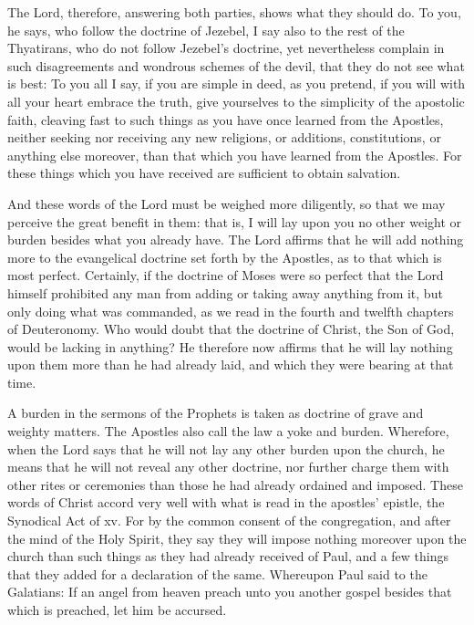 The Lord, therefore, answering both parties, shows what they should do. To you, he says, who follow the doctrine of Jezebel, I say also to the rest of the Thyatirans, who do not follow Jezebel’s doctrine, yet nevertheless complain in such disagreements and wondrous schemes of the devil, that they do not see what is best: To you all I say, if you are simple in deed, as you pretend, if you will with all your heart embrace the truth, give yourselves to the simplicity of the apostolic faith, cleaving fast to such things as you have once learned from the Apostles, neither seeking nor receiving any new religions, or additions, constitutions, or anything else moreover, than that which you have learned from the Apostles. For these things which you have received are sufficient to obtain salvation.

And these words of the Lord must be weighed more diligently, so that we may perceive the great benefit in them: that is, I will lay upon you no other weight or burden besides what you already have. The Lord affirms that he will add nothing more to the evangelical doctrine set forth by the Apostles, as to that which is most perfect. Certainly, if the doctrine of Moses were so perfect that the Lord himself prohibited any man from adding or taking away anything from it, but only doing what was commanded, as we read in the fourth and twelfth chapters of Deuteronomy. Who would doubt that the doctrine of Christ, the Son of God, would be lacking in anything? He therefore now affirms that he will lay nothing upon them more than he had already laid, and which they were bearing at that time.

A burden in the sermons of the Prophets is taken as doctrine of grave and weighty matters. The Apostles also call the law a yoke and burden. Wherefore, when the Lord says that he will not lay any other burden upon the church, he means that he will not reveal any other doctrine, nor further charge them with other rites or ceremonies than those he had already ordained and imposed. These words of Christ accord very well with what is read in the apostles’ epistle, the Synodical Act of xv. For by the common consent of the congregation, and after the mind of the Holy Spirit, they say they will impose nothing moreover upon the church than such things as they had already received of Paul, and a few things that they added for a declaration of the same. Whereupon Paul said to the Galatians: If an angel from heaven preach unto you another gospel besides that which is preached, let him be accursed.

